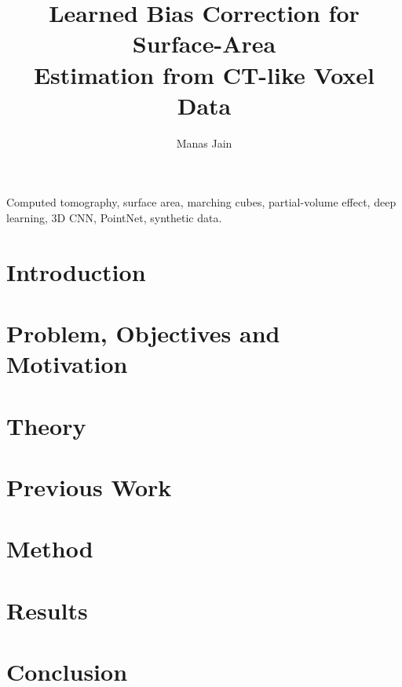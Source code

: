 \documentclass[journal]{IEEEtran}
\begin{document}
\title{Learned Bias Correction for Surface-Area\\ Estimation from CT-like Voxel Data}
\author{Manas Jain}
\maketitle

\begin{abstract}

\end{abstract}

\begin{IEEEkeywords}
Computed tomography, surface area, marching cubes, partial-volume effect, deep learning, 3D CNN,
PointNet, synthetic data.
\end{IEEEkeywords}

\section{Introduction}\label{sec:intro}


\section{Problem, Objectives and Motivation}\label{sec:problem}


\section{Theory}\label{sec:theory}


\section{Previous Work}\label{sec:previous}


\section{Method}\label{sec:method}


\section{Results}\label{sec:results}


\section{Conclusion}\label{sec:conclusion}

\end{document}

